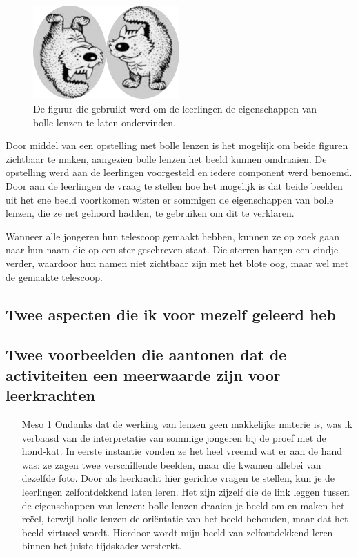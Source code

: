 \documentclass[a4paper,12pt,twoside]{article}%
\begin{document}
\begin{figure}[!b]
	\centering
	\includegraphics[width=0.5\textwidth]{HondKat}
	\caption{De figuur die gebruikt werd om de  leerlingen de eigenschappen van bolle lenzen te laten ondervinden.}
	\label{Fig::HondKat}
\end{figure}
Door middel van een opstelling met bolle lenzen is het mogelijk om beide figuren zichtbaar te maken, aangezien bolle lenzen het beeld kunnen omdraaien. De opstelling werd aan de leerlingen voorgesteld en iedere component werd benoemd. Door aan de  leerlingen de vraag te stellen hoe het mogelijk is dat beide beelden uit het ene beeld voortkomen wisten er sommigen de eigenschappen van bolle lenzen, die ze net gehoord hadden, te gebruiken om dit te verklaren. 

Wanneer alle jongeren hun telescoop gemaakt hebben, kunnen ze op zoek gaan naar hun naam die op een ster geschreven staat. Die sterren hangen een eindje verder, waardoor hun namen niet zichtbaar zijn met het blote oog, maar wel met de gemaakte telescoop. 

\subsection{Twee aspecten die ik voor mezelf geleerd heb}

\subsection{Twee voorbeelden die aantonen dat de activiteiten een meerwaarde zijn voor leerkrachten}
\begin{itemize}[labelwidth=3em,leftmargin =\dimexpr{}+\relax]
	\item[Meso 1] Ondanks dat de werking van lenzen geen makkelijke materie is, was ik verbaasd van de interpretatie van sommige jongeren bij de proef met de hond-kat. In eerste instantie vonden ze het heel vreemd wat er aan de hand was: ze zagen twee verschillende beelden, maar die kwamen allebei van dezelfde foto. Door als leerkracht hier gerichte vragen te stellen, kun je de leerlingen zelfontdekkend laten leren. Het zijn zijzelf die de link leggen tussen de eigenschappen van lenzen: bolle lenzen draaien je beeld om en maken het reëel, terwijl holle lenzen de oriëntatie van het beeld behouden, maar dat het beeld virtueel wordt. Hierdoor wordt mijn beeld van zelfontdekkend leren  binnen het juiste tijdskader versterkt.
\end{itemize}
\end{document}
